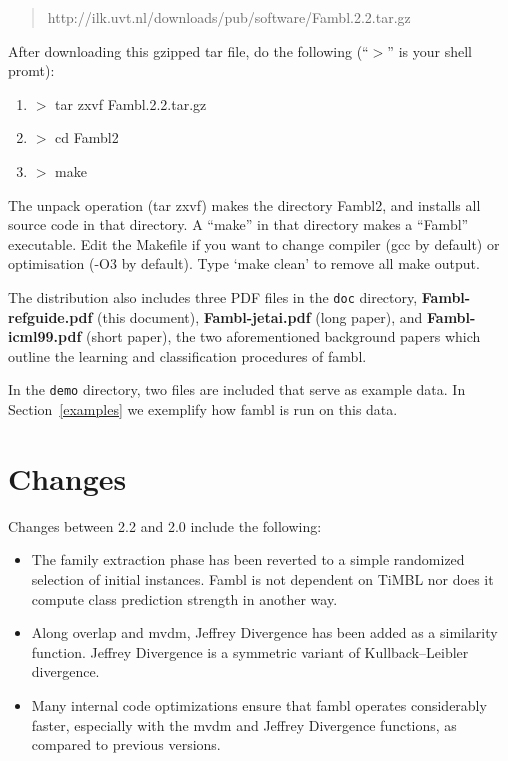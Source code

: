 \documentclass[11pt]{article}
\begin{document}
\begin{quote}
	http://ilk.uvt.nl/downloads/pub/software/Fambl.2.2.tar.gz
\end{quote}

After downloading this gzipped tar file, do the following (``$>$'' is
your shell promt):

\begin{enumerate}
\item
$>$ tar zxvf Fambl.2.2.tar.gz
\item
$>$ cd Fambl2
\item
$>$ make
\end{enumerate}

The unpack operation (tar zxvf) makes the directory Fambl2, and
installs all source code in that directory. A ``make'' in that
directory makes a ``Fambl'' executable. Edit the Makefile if you want
to change compiler (gcc by default) or optimisation (-O3 by
default). Type `make clean' to remove all make output.

The distribution also includes three PDF files in the {\tt doc}
directory, {\bf Fambl-refguide.pdf} (this document), {\bf
  Fambl-jetai.pdf} (long paper), and {\bf Fambl-icml99.pdf} (short
paper), the two aforementioned background papers which outline the
learning and classification procedures of {\sc fambl}.

In the {\tt demo} directory, two files are included that serve as
example data. In Section~\ref{examples} we exemplify how {\sc fambl}
is run on this data.

\section{Changes}
\label{changes}

Changes between 2.2 and 2.0 include the following:

\begin{itemize}
\item
The family extraction phase has been reverted to a simple randomized
selection of initial instances. {\sc Fambl} is not dependent on TiMBL nor
does it compute class prediction strength in another way.
\item
Along overlap and {\sc mvdm}, Jeffrey Divergence has been added as a
similarity function. Jeffrey Divergence is a symmetric variant of
Kullback--Leibler divergence.
\item
Many internal code optimizations ensure that {\sc fambl} operates
considerably faster, especially with the {\sc mvdm} and Jeffrey Divergence
functions, as compared to previous versions.
\end{itemize}
\end{document}
